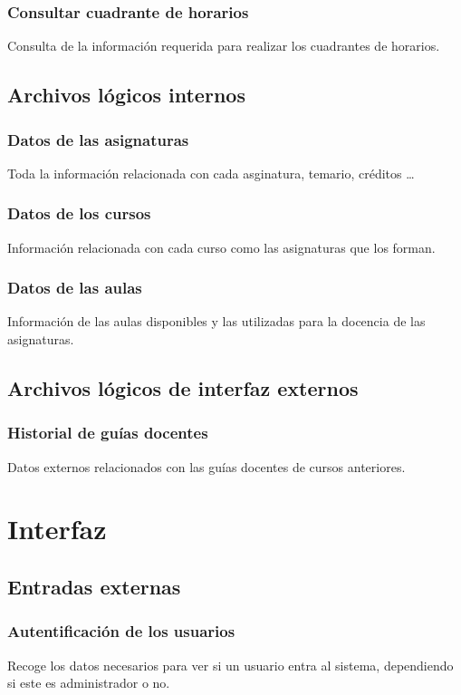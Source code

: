 \documentclass[11pt,a4paper,spanish,twoside]{book}
\begin{document}
\subsubsection{Consultar cuadrante de horarios}
Consulta de la información requerida para realizar los cuadrantes de horarios.
\subsection{Archivos lógicos internos}
\subsubsection{Datos de las asignaturas}
Toda la información relacionada con cada asginatura, temario, créditos \dots

\subsubsection{Datos de los cursos}
Información relacionada con cada curso como las asignaturas que los forman.

\subsubsection{Datos de las aulas}
Información de las aulas disponibles y las utilizadas para la docencia de las asignaturas.

\subsection{Archivos lógicos de interfaz externos}
\subsubsection{Historial de guías docentes}
Datos externos relacionados con las guías docentes de cursos anteriores. 

\section{Interfaz}
\subsection{Entradas externas}
\subsubsection{Autentificación de los usuarios}
Recoge los datos necesarios para ver si un usuario entra al sistema,
dependiendo si este es administrador o no.
\end{document}
